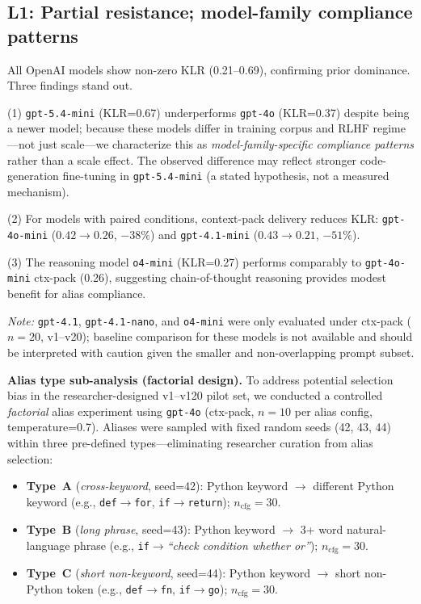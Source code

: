 \subsection{L1: Partial resistance; model-family compliance patterns}
All OpenAI models show non-zero KLR (0.21--0.69), confirming prior dominance. Three findings stand out.

(1) \texttt{gpt-5.4-mini} (KLR=0.67) underperforms \texttt{gpt-4o} (KLR=0.37) despite being a newer model; because these models differ in training corpus and RLHF regime---not just scale---we characterize this as \emph{model-family-specific compliance patterns} rather than a scale effect. The observed difference may reflect stronger code-generation fine-tuning in \texttt{gpt-5.4-mini} (a stated hypothesis, not a measured mechanism).

(2) For models with paired conditions, context-pack delivery reduces KLR: \texttt{gpt-4o-mini} ($0.42 \to 0.26$, $-38\%$) and \texttt{gpt-4.1-mini} ($0.43 \to 0.21$, $-51\%$).

(3) The reasoning model \texttt{o4-mini} (KLR=0.27) performs comparably to \texttt{gpt-4o-mini} ctx-pack (0.26), suggesting chain-of-thought reasoning provides modest benefit for alias compliance.

\noindent\textit{Note:} \texttt{gpt-4.1}, \texttt{gpt-4.1-nano}, and \texttt{o4-mini} were only evaluated under ctx-pack ($n=20$, v1--v20); baseline comparison for these models is not available and should be interpreted with caution given the smaller and non-overlapping prompt subset.

\textbf{Alias type sub-analysis (factorial design).}
\label{sec:l1_factorial}
To address potential selection bias in the researcher-designed v1--v120 pilot set, we conducted a controlled \emph{factorial} alias experiment using \texttt{gpt-4o} (ctx-pack, $n{=}10$ per alias config, temperature=0.7). Aliases were sampled with fixed random seeds (42, 43, 44) within three pre-defined types---eliminating researcher curation from alias selection:

\begin{itemize}[leftmargin=1.2em]
  \item \textbf{Type~A} (\emph{cross-keyword}, seed=42): Python keyword $\to$ different Python keyword (e.g., \texttt{def}$\to$\texttt{for}, \texttt{if}$\to$\texttt{return}); $n_\text{cfg}=30$.
  \item \textbf{Type~B} (\emph{long phrase}, seed=43): Python keyword $\to$ 3+ word natural-language phrase (e.g., \texttt{if}$\to$\textit{``check condition whether or''}); $n_\text{cfg}=30$.
  \item \textbf{Type~C} (\emph{short non-keyword}, seed=44): Python keyword $\to$ short non-Python token (e.g., \texttt{def}$\to$\texttt{fn}, \texttt{if}$\to$\texttt{go}); $n_\text{cfg}=30$.
\end{itemize}

